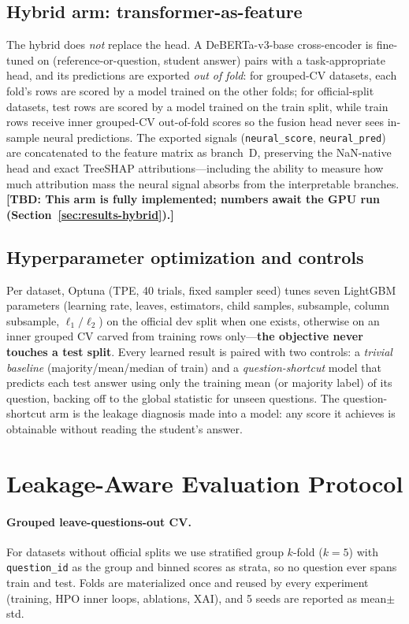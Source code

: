\documentclass[11pt]{article}
\newcommand{\TBD}[1]{\textbf{[TBD: #1]}}
\begin{document}
\subsection{Hybrid arm: transformer-as-feature}
\label{sec:method-hybrid}
The hybrid does \emph{not} replace the head. A DeBERTa-v3-base
\cite{he2021deberta,he2023debertav3} cross-encoder is fine-tuned on
(reference-or-question, student answer) pairs with a task-appropriate head, and
its predictions are exported \emph{out of fold}: for grouped-CV datasets, each
fold's rows are scored by a model trained on the other folds; for
official-split datasets, test rows are scored by a model trained on the train
split, while train rows receive inner grouped-CV out-of-fold scores so the
fusion head never sees in-sample neural predictions. The exported signals
(\texttt{neural\_score}, \texttt{neural\_pred}) are concatenated to the feature
matrix as branch~D, preserving the NaN-native head and exact TreeSHAP
attributions---including the ability to measure how much attribution mass the
neural signal absorbs from the interpretable branches.
\TBD{This arm is fully implemented; numbers await the GPU run
(Section~\ref{sec:results-hybrid}).}

\subsection{Hyperparameter optimization and controls}
Per dataset, Optuna \cite{akiba2019optuna} (TPE, 40 trials, fixed sampler seed)
tunes seven LightGBM parameters (learning rate, leaves, estimators, child
samples, subsample, column subsample, $\ell_1/\ell_2$) on the official dev
split when one exists, otherwise on an inner grouped CV carved from training
rows only---\textbf{the objective never touches a test split}. Every learned
result is paired with two controls: a \emph{trivial baseline}
(majority/mean/median of train) and a \emph{question-shortcut} model that
predicts each test answer using only the training mean (or majority label) of
its question, backing off to the global statistic for unseen questions. The
question-shortcut arm is the leakage diagnosis made into a model: any score it
achieves is obtainable without reading the student's answer.

\section{Leakage-Aware Evaluation Protocol}
\label{sec:protocol}

\paragraph{Grouped leave-questions-out CV.}
For datasets without official splits we use stratified group $k$-fold
($k{=}5$) with \texttt{question\_id} as the group and binned scores as strata,
so no question ever spans train and test. Folds are materialized once and
reused by every experiment (training, HPO inner loops, ablations, XAI), and
5 seeds are reported as mean$\pm$std.
\end{document}

